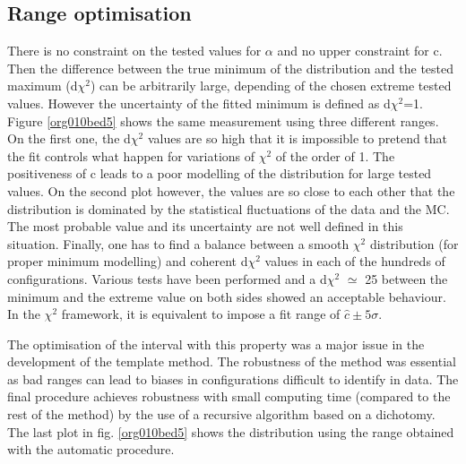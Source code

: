 \subsection{Range optimisation}
\label{sec:org04cf407}
\label{sec:Calibration_inSitu_Tuning_range}

There is no constraint on the tested values for $\alpha$ and no upper constraint for c.
Then the difference between the true minimum of the distribution and the tested maximum (d$\chi^2$) can be arbitrarily large, depending of the chosen extreme tested values.
However the uncertainty of the fitted minimum is defined  as d$\chi^2$=1.
Figure \ref{org010bed5} shows the same measurement using three different ranges.
On the first one, the d$\chi^2$ values are so high that it is impossible to pretend that the fit controls what happen for variations of $\chi^2$ of the order of 1.
The positiveness of c leads to a poor modelling of the distribution for large tested values.
On the second plot however, the values are so close to each other that the distribution is dominated by the statistical fluctuations of the data and the MC.
The most probable value and its uncertainty are not well defined in this situation.
Finally, one has to find a balance between a smooth $\chi^2$ distribution (for proper minimum modelling) and coherent d$\chi^2$ values in each of the hundreds of configurations.
Various tests have been performed and a d$\chi^2$ \(\simeq\) 25 between the minimum and the extreme value on both sides showed an acceptable behaviour.
In the $\chi^2$ framework, it is equivalent to impose a fit range of $\hat{c}\pm 5\sigma$.

The optimisation of the interval with this property was a major issue in the development of the template method.
The robustness of the method was essential as bad ranges can lead to biases in configurations difficult to identify in data.
The final procedure achieves robustness with small computing time (compared to the rest of the method) by the use of a recursive algorithm based on a dichotomy.
The last plot in fig. \ref{org010bed5} shows the distribution using the range obtained with the automatic procedure.

